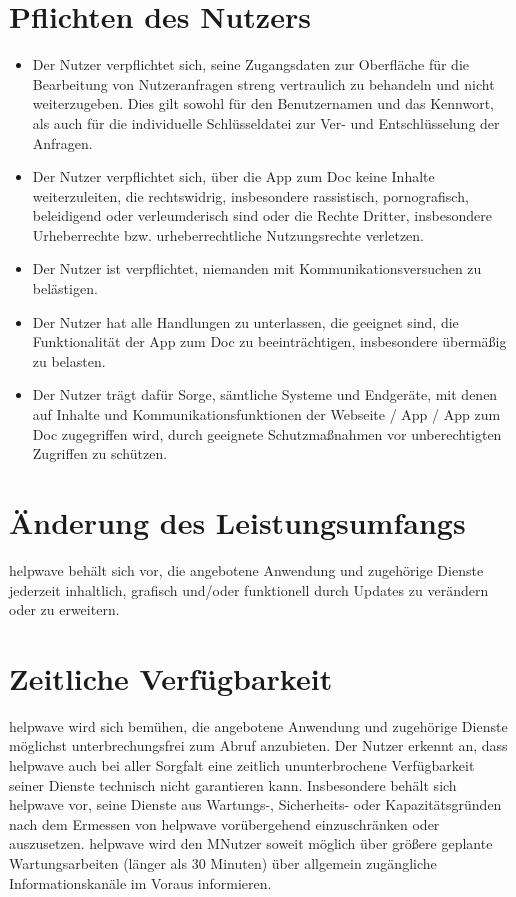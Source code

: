 \documentclass[10pt]{article}
\begin{document}
\section{Pflichten des Nutzers}
\begin{itemize}
	\item Der Nutzer verpflichtet sich, seine Zugangsdaten zur Oberfläche für die Bearbeitung von Nutzeranfragen streng vertraulich zu behandeln und nicht weiterzugeben. Dies gilt sowohl für den Benutzernamen und das Kennwort, als auch für die individuelle Schlüsseldatei zur Ver- und Entschlüsselung der Anfragen.
	\item Der Nutzer verpflichtet sich, über die App zum Doc keine Inhalte weiterzuleiten, die rechtswidrig, insbesondere
	      rassistisch, pornografisch, beleidigend oder verleumderisch sind oder die Rechte Dritter, insbesondere Urheberrechte bzw.
	      urheberrechtliche Nutzungsrechte verletzen.
	\item Der Nutzer ist verpflichtet, niemanden mit Kommunikationsversuchen zu belästigen.
	\item Der Nutzer hat alle Handlungen zu unterlassen, die geeignet sind, die Funktionalität der App zum Doc zu beeinträchtigen, insbesondere übermäßig zu belasten.
	\item Der Nutzer trägt dafür Sorge, sämtliche Systeme und Endgeräte, mit denen auf Inhalte und Kommunikationsfunktionen der Webseite / App / App zum Doc zugegriffen wird, durch geeignete Schutzmaßnahmen vor unberechtigten
	      Zugriffen zu schützen.
\end{itemize}

\section{Änderung des Leistungsumfangs}
helpwave behält sich vor, die angebotene Anwendung und zugehörige Dienste jederzeit inhaltlich, grafisch und/oder funktionell durch Updates zu verändern oder zu erweitern.

\section{Zeitliche Verfügbarkeit}
helpwave wird sich bemühen, die angebotene Anwendung und zugehörige Dienste möglichst unterbrechungsfrei zum Abruf
anzubieten. Der Nutzer erkennt an, dass helpwave auch bei aller Sorgfalt eine zeitlich ununterbrochene Verfügbarkeit
seiner Dienste technisch nicht garantieren kann. Insbesondere behält sich helpwave vor, seine Dienste aus Wartungs-, Sicherheits- oder Kapazitätsgründen nach dem Ermessen von helpwave vorübergehend einzuschränken oder auszusetzen. helpwave wird den MNutzer soweit möglich über größere geplante Wartungsarbeiten (länger als 30 Minuten) über allgemein zugängliche Informationskanäle im Voraus informieren.
\end{document}
